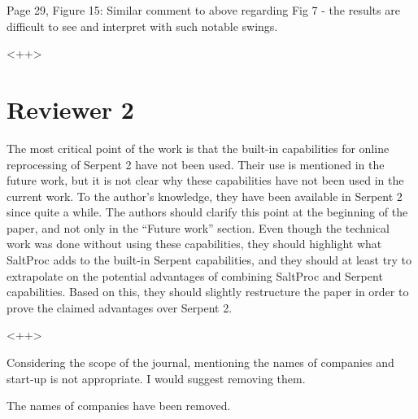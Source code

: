 \documentclass[answers,11pt]{exam}
\begin{document}
\begin{questions}
        \question  Page 29, Figure 15: Similar comment to above regarding Fig 7 
        - the results are difficult to see and interpret with such notable 
        swings.
        \begin{solution}
                <++>
        \end{solution}





        \section*{Reviewer 2}


        \question The most critical point of the work is that the built-in 
        capabilities for online reprocessing of Serpent 2 have not been used. 
        Their use is mentioned in the future work, but it is not clear why 
        these capabilities have not been used in the current work. To the 
        author's knowledge, they have been available in Serpent 2 since quite a 
        while. The authors should clarify this point at the beginning of the 
        paper, and not only in the ``Future work'' section. Even though the 
        technical work was done without using these capabilities, they should 
        highlight what  SaltProc adds to the built-in Serpent capabilities, and 
        they should at least try to extrapolate on the potential advantages of 
        combining  SaltProc and Serpent capabilities. Based on this, they 
        should slightly restructure the paper in order to prove the claimed 
        advantages over Serpent 2.
        \begin{solution}
                <++>
        \end{solution}


        \question Considering the scope of the journal, mentioning the names of 
        companies and start-up is not appropriate. I would suggest removing 
        them.
        \begin{solution}
                The names of companies have been removed.
        \end{solution}


\end{questions}
\end{document}
